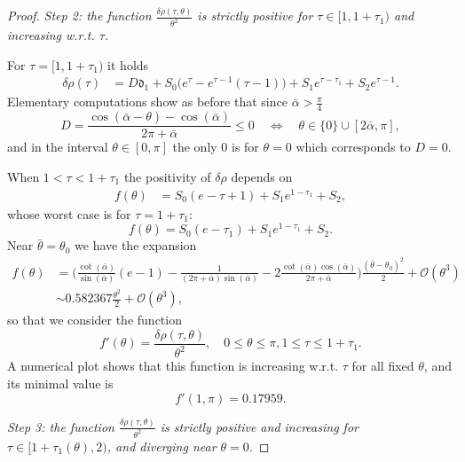 \documentclass[reqno]{amsart}
\theoremstyle{definition} \newtheorem{definition}{Definition}[section]
\theoremstyle{definition} \newtheorem{remark}[definition]{Remark}
\theoremstyle{plain} \newtheorem{lemma}[definition]{Lemma}
\theoremstyle{plain} \newtheorem{proposition}[definition]{Proposition}
\theoremstyle{plain} \newtheorem{theorem}[definition]{Theorem}
\theoremstyle{plain} \newtheorem{corollary}[definition]{Corollary}
\theoremstyle{definition} \newtheorem{example}[definition]{Example}
\theoremstyle{plain} \newtheorem{claim}[clai]{Claim}
\theoremstyle{definition} \newtheorem{assumption}[definition]{Assumption}
\theoremstyle{definition} \newtheorem{observation}[definition]{Observation}
\newcommand{\1}{\mathbbm 1}
\newcommand{\Diracd}{\mathfrak{d}}
\numberwithin{equation}{section} %
\theoremstyle{plain} \newtheorem*{theorem*}{Theorem}
\theoremstyle{plain} \newtheorem{mthm}[maintheorem]{Main Theorem}
\theoremstyle{plain} \newtheorem*{mthm*}{Main Theorem}
\theoremstyle{plain} \newtheorem*{conjecture*}{Conjecture}
\theoremstyle{plain} \newtheorem{conjecture}[definition]{Conjecture}
\theoremstyle{plain} \newtheorem*{problem*}{Problem}
\begin{document}
\begin{proof}
{\it Step 2: the function $\frac{\delta \rho(\tau,\theta)}{\theta^2}$ is strictly positive for $\tau \in [1,1+\tau_1)$ and increasing w.r.t. $\tau$.}

\noindent For $\tau = [1,1+\tau_1)$ it holds
\begin{align*}
\delta \rho(\tau) &= D \Diracd_1 + S_0 \big( e^\tau - e^{\tau - 1} (\tau - 1) \big) + S_1 e^{\tau - \tau_1} + S_2 e^{\tau - 1}.
\end{align*}
Elementary computations show as before that since $\bar \alpha > \frac{\pi}{4}$
$$
D = \frac{\cos(\bar \alpha - \theta) - \cos(\bar \alpha)}{2\pi + \bar \alpha} \leq 0 \quad \Longleftrightarrow \quad \theta \in \{0\} \cup [2\bar \alpha,\pi],
$$
and in the interval $\theta \in [0,\pi]$ the only $0$ is for $\theta = 0$ which corresponds to $D = 0$.

When $1 < \tau < 1 + \tau_1$ the positivity of $\delta \rho$ depends on
\begin{align*}
f(\theta) &= S_0 (e - \tau + 1) + S_1 e^{1 - \tau_1} + S_2,
\end{align*}
whose worst case is for $\tau = 1 + \tau_1$:
\begin{equation*}
f(\theta) = S_0 (e - \tau_1) + S_1 e^{1-\tau_1} + S_2.
\end{equation*}
Near $\bar \theta = \theta_0$ we have the expansion
\begin{equation}
\label{Equa:first_round_exp_segm}
\begin{split}
f(\theta) &= \bigg( \frac{\cot(\bar \alpha)}{\sin(\bar \alpha)} (e-1) - \frac{1}{(2\pi + \bar \alpha) \sin(\bar \alpha)} - 2 \frac{\cot(\bar \alpha) \cos(\bar \alpha)}{2\pi + \bar \alpha} \bigg) \frac{(\bar \theta - \theta_0)^2}{2} + \mathcal O(\theta^3) \\
&\sim 0.582367 \frac{\theta^2}{2} + \mathcal O(\theta^3),
\end{split}
\end{equation}
so that we consider the function
\begin{equation*}
f'(\theta) = \frac{\delta \rho(\tau,\theta)}{\theta^2}, \quad 0 \leq \theta \leq \pi, 1 \leq \tau \leq 1 + \tau_1. 
\end{equation*}
A numerical plot shows that this function is increasing w.r.t. $\tau$ for all fixed $\theta$, and its minimal value is
\begin{equation*}
f'(1,\pi) = 0.17959.
\end{equation*}

\medskip

{\it Step 3: the function $\frac{\delta \rho(\tau,\theta)}{\theta^2}$ is strictly positive and increasing for $\tau \in [1+\tau_1(\theta),2)$, and diverging near $\theta = 0$.}


\end{proof}
\end{document}
